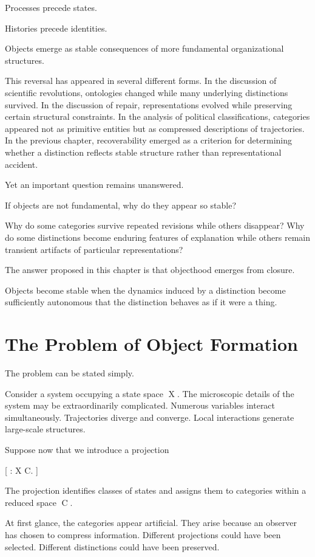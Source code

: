 \documentclass[11pt,oneside,openany]{book}
\begin{document}
Processes precede states.

Histories precede identities.

Objects emerge as stable consequences of more fundamental organizational structures.

This reversal has appeared in several different forms. In the discussion of scientific revolutions, ontologies changed while many underlying distinctions survived. In the discussion of repair, representations evolved while preserving certain structural constraints. In the analysis of political classifications, categories appeared not as primitive entities but as compressed descriptions of trajectories. In the previous chapter, recoverability emerged as a criterion for determining whether a distinction reflects stable structure rather than representational accident.

Yet an important question remains unanswered.

If objects are not fundamental, why do they appear so stable?

Why do some categories survive repeated revisions while others disappear? Why do some distinctions become enduring features of explanation while others remain transient artifacts of particular representations?

The answer proposed in this chapter is that objecthood emerges from closure.

Objects become stable when the dynamics induced by a distinction become sufficiently autonomous that the distinction behaves as if it were a thing.

\section{The Problem of Object Formation}

The problem can be stated simply.

Consider a system occupying a state space X. The microscopic details of the system may be extraordinarily complicated. Numerous variables interact simultaneously. Trajectories diverge and converge. Local interactions generate large-scale structures.

Suppose now that we introduce a projection

[
\pi : X \rightarrow C.
]

The projection identifies classes of states and assigns them to categories within a reduced space C.

At first glance, the categories appear artificial. They arise because an observer has chosen to compress information. Different projections could have been selected. Different distinctions could have been preserved.
\end{document}
